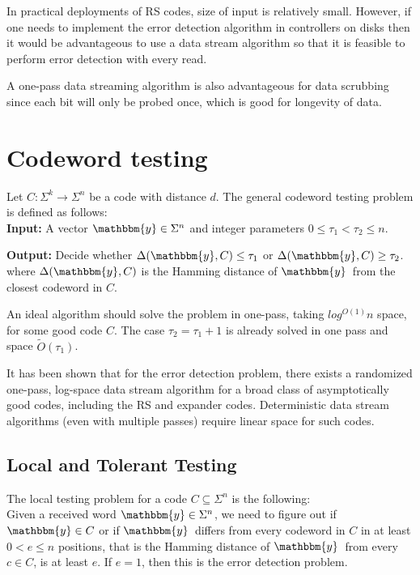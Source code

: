 \documentclass{article}
\newcommand{\y}{\ensuremath{\mathbbm{y}}}
\begin{document}
In practical deployments of RS codes, size of input is relatively small.
However, if one needs to implement the error detection algorithm in controllers on disks
then it would be advantageous to use a data stream algorithm
so that it is feasible to perform error detection with every read.

A one-pass data streaming algorithm is also advantageous for data scrubbing since each bit will only be probed once,
which is good for longevity of data.

\section{Codeword testing\cite{sublinear}}

Let $C: \Sigma^k \to \Sigma^n$ be a code with distance $d$.
The general codeword testing problem is defined as follows:\\

\textbf{Input:} A vector $\y \in \Sigma^n$ and integer parameters $0 \le \tau_1 < \tau_2 \le n$.

\textbf{Output:} Decide whether $\Delta(\y,C) \le \tau_1$ or $\Delta(\y,C) \ge \tau_2$.\\

where $\Delta(\y,C)$ is the Hamming distance of \y\ from the closest codeword in $C$.

An ideal algorithm should solve the problem in one-pass, taking $log^{O(1)}n$ space, for some good code $C$.
The case $\tau_2 = \tau_1 + 1$ is already solved in one pass and space $\tilde{O}(\tau_1)$\cite{rudra2010data}.

It has been shown\cite{rudra2010data} that for the error detection problem,
there exists a randomized one-pass, log-space data stream algorithm for
a broad class of asymptotically good codes, including the RS and expander codes.
Deterministic data stream algorithms (even with multiple passes) require linear space for such codes\cite{rudra2010data}.

\subsection{Local and Tolerant Testing}
The local testing problem for a code $C \subseteq \Sigma^n$ is the following:\\

Given a received word $\y \in \Sigma^n$, we need to figure out if $\y \in C$ or
if \y\ differs from every codeword in $C$ in at least $0 < e \le n$ positions,
that is the Hamming distance of \y\ from every $c \in C$, is at least $e$.
If $e = 1$, then this is the error detection problem.\\
\end{document}
